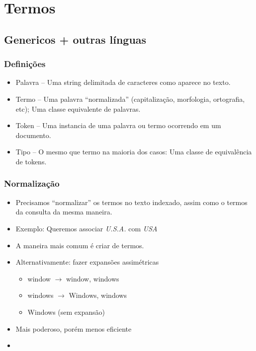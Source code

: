 \documentclass[compress]{beamer}
\begin{document}
\section{Termos}

\subsection{Genericos + outras línguas}

\begin{frame}
\frametitle{Definições}
\begin{itemize}[<+->]
\item {\color{blue}Palavra} -- Uma string delimitada de caracteres como aparece 
no texto.
\item {\color{blue}Termo} -- Uma palavra ``normalizada'' (capitalização, 
morfologia, ortografia, etc); Uma classe equivalente de palavras.
\item {\color{blue}Token} -- Uma instancia de uma palavra ou termo ocorrendo em 
um documento.
\item {\color{blue}Tipo} -- O mesmo que termo na maioria dos casos: Uma classe 
de equivalência de tokens.
\end{itemize}
\end{frame}

\begin{frame}
\frametitle{Normalização}
\begin{itemize}[<+->]
\item Precisamos ``normalizar'' os termos no texto indexado, assim como o 
termos da consulta da mesma maneira.
\item Exemplo: Queremos associar \emph{U.S.A.} com \emph{USA}
\item A maneira mais comum é criar 
  de termos.
\item Alternativamente: fazer expansões assimétricas
\begin{itemize}[<+->]
\item window $\rightarrow$ window, windows
\item windows $\rightarrow$ Windows, windows
\item Windows (sem expansão)
\end{itemize}
\item Mais poderoso, porém menos eficiente
\item {}
\end{itemize}
\end{frame}
\end{document}
